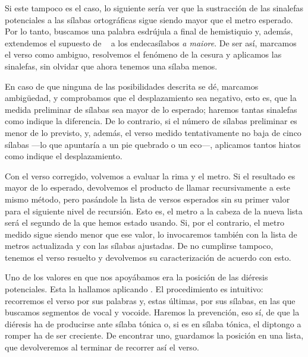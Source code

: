Si este tampoco es el caso, lo siguiente sería ver que la sustracción de las sinalefas potenciales a las sílabas ortográficas  sigue siendo mayor que el metro esperado. Por lo tanto, buscamos una palabra esdrújula a final de hemistiquio y, además, extendemos el supuesto de \citeauthor{navarrotomas1991}~\parencite*[40]{navarrotomas1991} a los endecasílabos \textit{a maiore}. De ser así, marcamos el verso como ambiguo, resolvemos el fenómeno de la cesura y aplicamos las sinalefas, sin olvidar que ahora tenemos una sílaba menos.

En caso de que ninguna de las posibilidades descrita se dé, marcamos ambigüedad, y comprobamos que el desplazamiento sea negativo, esto es, que la medida preliminar de sílabas sea mayor de lo esperado; haremos tantas sinalefas como indique la diferencia. De lo contrario, si el número de sílabas preliminar es menor de lo previsto, y, además, el verso medido tentativamente no baja de cinco sílabas —lo que apuntaría a un pie quebrado o un eco—, aplicamos tantos hiatos como indique el desplazamiento. 

Con el verso corregido, volvemos a evaluar la rima y el metro. Si el resultado es mayor de lo esperado, devolvemos el producto de llamar recursivamente a este mismo método, pero pasándole la lista de versos esperados sin su primer valor para el siguiente nivel de recursión. Esto es, el metro a la cabeza de la nueva lista será el segundo de la que hemos estado usando.  Si, por el contrario, el metro medido sigue siendo menor que ese valor, lo invocaremos también con la lista de metros actualizada y con las sílabas ajustadas. De no cumplirse tampoco, tenemos el verso resuelto y devolvemos su caracterización de acuerdo con esto.

Uno de los valores en que nos apoyábamos era la posición de las diéresis potenciales. Esta la hallamos aplicando . El procedimiento es intuitivo: recorremos el verso por sus palabras y, estas últimas, por sus sílabas, en las que buscamos segmentos de vocal y vocoide. Haremos la prevención, eso sí, de que la diéresis ha de producirse ante sílaba tónica o, si es en sílaba tónica, el diptongo a romper ha de ser creciente. De encontrar uno, guardamos la posición en una lista, que devolveremos al terminar de recorrer así el verso.


